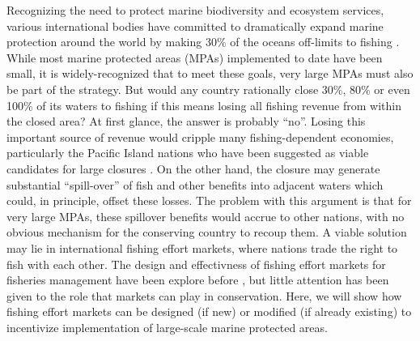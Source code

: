 \documentclass[12pt]{article}
\begin{document}
Recognizing the need to protect marine biodiversity and ecosystem services, various international bodies have committed to dramatically expand marine protection around the world by making 30\% of the oceans off-limits to fishing \cite{oleary_2016,dinerstein_2019}. While most marine protected areas (MPAs) implemented to date have been small, it is widely-recognized that to meet these goals, very large MPAs must also be part of the strategy. But would any country rationally close 30\%, 80\% or even 100\% of its waters to fishing if this means losing all fishing revenue from within the closed area? At first glance, the answer is probably ``no''. Losing this important source of revenue would cripple many fishing-dependent economies, particularly the Pacific Island nations who have been suggested as viable candidates for large closures \cite{mcleod_2019}. On the other hand, the closure may generate substantial ``spill-over'' of fish and other benefits into adjacent waters which could, in principle, offset these losses. The problem with this argument is that for very large MPAs, these spillover benefits would accrue to other nations, with no obvious mechanism for the conserving country to recoup them. A viable solution may lie in international fishing effort markets, where nations trade the right to fish with each other. The design and effectivness of fishing effort markets for fisheries management have been explore before \cite{havice_2010,havice_2013}, but little attention has been given to the role that markets can play in conservation. Here, we will show how fishing effort markets can be designed (if new) or modified (if already existing) to incentivize implementation of large-scale marine protected areas.
\end{document}

